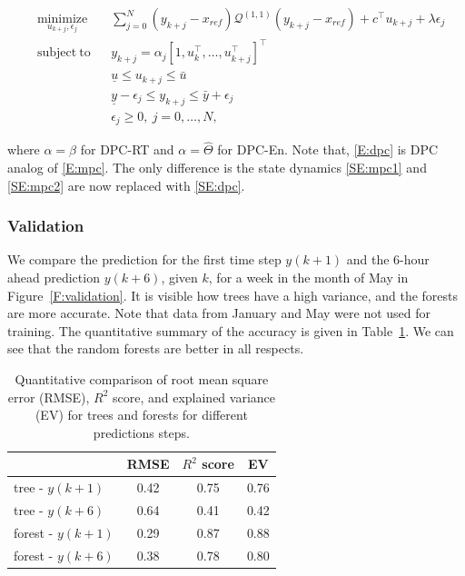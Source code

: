 \begin{subequations}
	\begin{align}
	& \underset{u_{k+j},\epsilon_j}{\mathrm{minimize}} & & \sum_{j=0}^{N} (y_{k+j}-x_{ref})\mathcal{Q}^{(1,1)} (y_{k+j}-x_{ref})+c^\top u_{k+j}+\lambda\epsilon_j \\
	& \mathrm{subject\ to }                              & & y_{k+j} =  \alpha_j \left[1,u^\top_{k},\ldots,u^\top_{k+j} \right]^\top \label{SE:dpc}               \\
	&                                                    & & \underline{u} \leq u_{k+j} \leq \bar{u} 	                                                          \\
	&                                                    & & \underline{y} - \epsilon_j \leq y_{k+j} \leq \bar{y} + \epsilon_j                                    \\
	&                                                    & & \epsilon_j \geq 0, \ j = 0,\dots,N,            									                 
	\end{align}\label{E:dpc}
\end{subequations} 

\noindent where $\alpha = \beta$ for DPC-RT and $\alpha = \hat{\Theta}$ for DPC-En.
Note that, \eqref{E:dpc} is DPC analog of \eqref{E:mpc}. The only difference is the state dynamics \eqref{SE:mpc1} and \eqref{SE:mpc2} are now replaced with \eqref{SE:dpc}.

\subsubsection{Validation} 
\label{SSS:dpc_val}

We compare the prediction for the first time step $y(k+1)$ and the 6-hour ahead prediction $y(k+6)$, given $k$, for a week in the month of May in Figure~\ref{F:validation}. It is visible how trees have a high variance, and the forests are more accurate. Note that data from January and May were not used for training. The quantitative summary of the accuracy is given in Table~\ref{T:validation}. We can see that the random forests are better in all respects.
\begin{table}[h!]
	\centering
	\begin{tabular}{lccc}
		\toprule
		                 & RMSE & $R^2$ score & EV  \\ 
		\midrule
		tree - $y(k+1)$    & 0.42 & 0.75        & 0.76 \\
		tree - $y(k+6)$    & 0.64 & 0.41        & 0.42 \\
		forest - $y(k+1)$  & 0.29 & 0.87        & 0.88 \\
		forest - $y(k+6)$  & 0.38 & 0.78        & 0.80 \\
		\bottomrule
	\end{tabular}
	\caption{Quantitative comparison of root mean square error (RMSE), $R^2$ score, and explained variance (EV) for trees and forests for different predictions steps.}
	\captionsetup{justification=centering}
	\label{T:validation}
\end{table}

